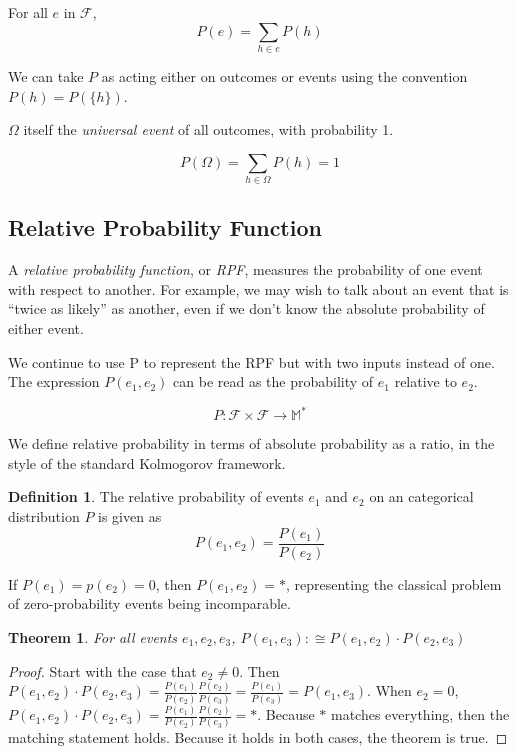 \documentclass[twoside]{article}
\newcommand{\quotes}[1]{``#1''}
\theoremstyle{plain}%
\newtheorem{theorem}{Theorem}[section]
\theoremstyle{definition}
\newtheorem{definition}{Definition}[section]
\theoremstyle{remark}
\begin{document}
For all \(e\) in \(\mathcal{F}\),
\[ P(e) = \sum_{h \in e}{P(h)}\]

We can take \(P\) as acting either on outcomes or events using the convention \(P(h) = P(\{h\})\).

\(\Omega\) itself the \textit{universal event} of all outcomes, with probability 1.

\[P(\Omega) = \sum_{h \in \Omega}{P(h)} = 1\]

\subsection{Relative Probability Function}
\label{section:standard_relative_prob}

A \textit{relative probability function}, or \textit{RPF}, measures the probability of one event with respect to another. For example, we may wish to talk about an event that is \quotes{twice as likely} as another, even if we don't know the absolute probability of either event.

We continue to use P to represent the RPF but with two inputs instead of one. The expression \(P(e_1, e_2)\) can be read as the probability of \(e_1\) relative to \(e_2\).

\[P: \mathcal{F} \times \mathcal{F} \rightarrow \mathbb{M}^*\]

We define relative probability in terms of absolute probability as a ratio, in the style of the standard Kolmogorov framework.

\begin{definition}
\label{def:ratio}
The relative probability of events \(e_1\) and \(e_2\) on an categorical distribution \(P\) is given as
\[P(e_1, e_2) = \frac{P(e_1)}{P(e_2)}\]
\end{definition}

If \(P(e_1) = p(e_2) = 0\), then \(P(e_1, e_2) = \ast\), representing the classical problem of zero-probability events being incomparable.

\begin{theorem}
For all events \(e_1, e_2, e_3\), \(P(e_1, e_3) :\cong P(e_1, e_2) \cdot P(e_2, e_3)\)
\end{theorem}

\begin{proof}
Start with the case that \(e_2 \neq 0\). Then \(P(e_1, e_2) \cdot P(e_2, e_3) = \frac{P(e_1)}{P(e_2)}\frac{P(e_2)}{P(e_3)} = \frac{P(e_1)}{P(e_3)} = P(e_1, e_3)\). When \(e_2 = 0\), \(P(e_1, e_2) \cdot P(e_2, e_3) = \frac{P(e_1)}{P(e_2)}\frac{P(e_2)}{P(e_3)} = \ast\). Because \(\ast\) matches everything, then the matching statement holds. Because it holds in both cases, the theorem is true.
\end{proof}
\end{document}
